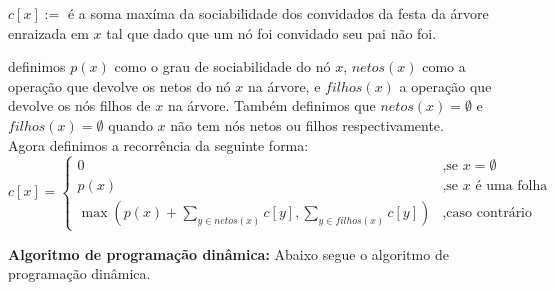 \begin{framed}

\noindent $c[x] := $  é a soma maxíma da sociabilidade dos convidados da festa 
da árvore enraizada em $x$ tal que dado que um nó foi convidado seu pai não foi.

\end{framed}

\noindent definimos $p(x)$ como o grau de sociabilidade do nó $x$, $netos(x)$ 
como a operação que devolve os netos do nó $x$ 
na árvore, e $filhos(x)$ a operação que devolve os nós filhos de $x$ na árvore. 
Também definimos que $netos(x) = \emptyset$ e $filhos(x) = \emptyset$ quando 
$x$ não tem nós netos ou filhos respectivamente.
\\[6pt]
\noindent Agora definimos a recorrência da seguinte forma:
\begin{equation*}
    c[x] =
    \begin{cases}
      0 & \text{,se } x = \emptyset \\
      p(x) & \text{,se $x$ é uma folha}  \\      
      \max{(p(x) + \sum_{y \in netos(x)}c[y], \sum_{y \in filhos(x)}c[y])}
                                              & \text{,caso contrário}
    \end{cases}
  \end{equation*}
 
\noindent \textbf{Algoritmo de programação dinâmica: } Abaixo segue o algoritmo 
de programação dinâmica.